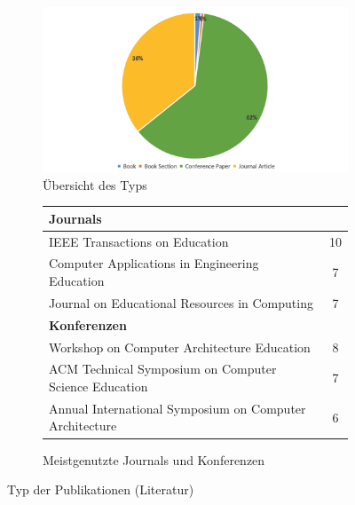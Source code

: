 \begin{figure}[!htbp]
    \centering
    \begin{subfigure}[b]{0.48\textwidth}
        \centering
        \includegraphics[width=1\textwidth]{graphics_lit/2-typ.png}
        \caption{Übersicht des Typs} 
        \label{fig:2-typ}
    \end{subfigure}
    \hfill
    \begin{subfigure}[b]{0.48\textwidth}
        \centering
        \tiny
        \begin{tabularx}{\textwidth}{X c}
            \hline
            \multicolumn{2}{l}{\textbf{Journals}} \\
            \hline
            IEEE Transactions on Education & 10 \\
            Computer Applications in Engineering Education & 7 \\
            Journal on Educational Resources in Computing & 7 \\
            \hline
            \multicolumn{2}{l}{\textbf{Konferenzen}} \\
            \hline
            Workshop on Computer Architecture Education & 8 \\
            ACM Technical Symposium on Computer Science Education & 7 \\
            Annual International Symposium on Computer Architecture & 6 \\
            \hline
        \end{tabularx}
        \caption{Meistgenutzte Journals und Konferenzen}
        \label{tab:2-typ-detail}
    \end{subfigure}
    \caption{Typ der Publikationen (Literatur)}
    \label{fig:2-typ-gesamt}
\end{figure}

